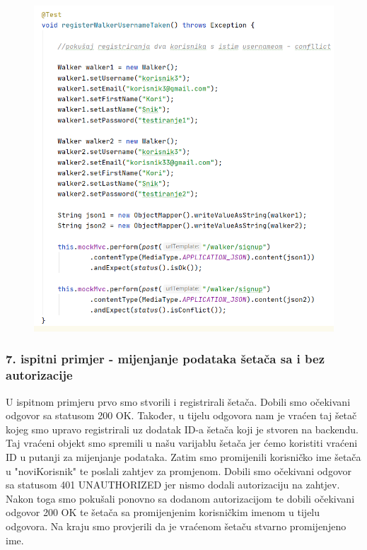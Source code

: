 			
			\begin{figure}[H]
				\centerline{
					\includegraphics[scale=0.75]{slike/walker2.PNG}} %
				\centering
			\end{figure}
			
			
			\subsubsection{7. ispitni primjer - mijenjanje podataka šetača sa i bez autorizacije }
			
			U ispitnom primjeru prvo smo stvorili i registrirali  šetača. Dobili smo očekivani odgovor sa statusom 200 OK. Također, u tijelu odgovora nam je vraćen taj šetač kojeg smo upravo registrirali uz dodatak ID-a šetača koji je stvoren na backendu. Taj vraćeni objekt smo spremili u našu varijablu šetača jer ćemo koristiti vraćeni ID u putanji za mijenjanje podataka. Zatim smo promijenili korisničko ime šetača u "noviKorisnik" te poslali zahtjev za promjenom. Dobili smo očekivani odgovor sa statusom 401 UNAUTHORIZED jer nismo dodali autorizaciju na zahtjev. Nakon toga smo pokušali ponovno sa dodanom autorizacijom te dobili očekivani odgovor 200 OK te šetača sa promijenjenim korisničkim imenom u tijelu odgovora. Na kraju smo provjerili da je vraćenom šetaču stvarno promijenjeno ime.
			
